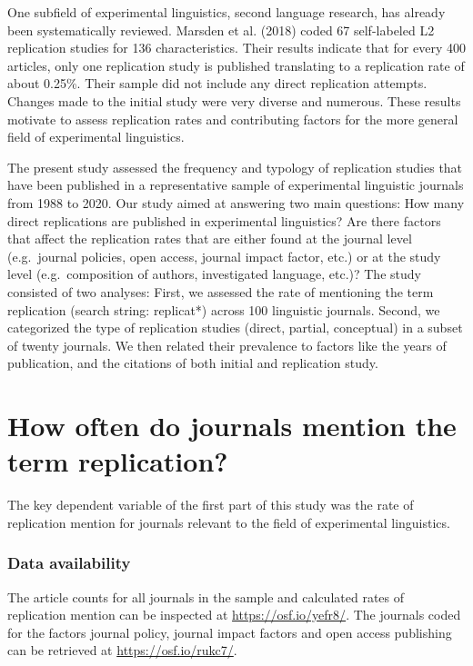 \documentclass[]{elsarticle} %
\begin{document}
One subfield of experimental linguistics, second language research, has
already been systematically reviewed. Marsden et al. (2018) coded 67
self-labeled L2 replication studies for 136 characteristics. Their
results indicate that for every 400 articles, only one replication study
is published translating to a replication rate of about 0.25\%. Their
sample did not include any direct replication attempts. Changes made to
the initial study were very diverse and numerous. These results motivate
to assess replication rates and contributing factors for the more
general field of experimental linguistics.

The present study assessed the frequency and typology of replication
studies that have been published in a representative sample of
experimental linguistic journals from 1988 to 2020. Our study aimed at
answering two main questions: How many direct replications are published
in experimental linguistics? Are there factors that affect the
replication rates that are either found at the journal level
(e.g.~journal policies, open access, journal impact factor, etc.) or at
the study level (e.g.~composition of authors, investigated language,
etc.)? The study consisted of two analyses: First, we assessed the rate
of mentioning the term replication (search string: replicat*) across 100
linguistic journals. Second, we categorized the type of replication
studies (direct, partial, conceptual) in a subset of twenty journals. We
then related their prevalence to factors like the years of publication,
and the citations of both initial and replication study.

\hypertarget{how-often-do-journals-mention-the-term-replication}{%
\section{How often do journals mention the term
replication?}\label{how-often-do-journals-mention-the-term-replication}}

The key dependent variable of the first part of this study was the rate
of replication mention for journals relevant to the field of
experimental linguistics.

\hypertarget{data-availability}{%
\subsubsection{Data availability}\label{data-availability}}

The article counts for all journals in the sample and calculated rates
of replication mention can be inspected at \url{https://osf.io/yefr8/}.
The journals coded for the factors journal policy, journal impact
factors and open access publishing can be retrieved at
\url{https://osf.io/rukc7/}.
\end{document}
